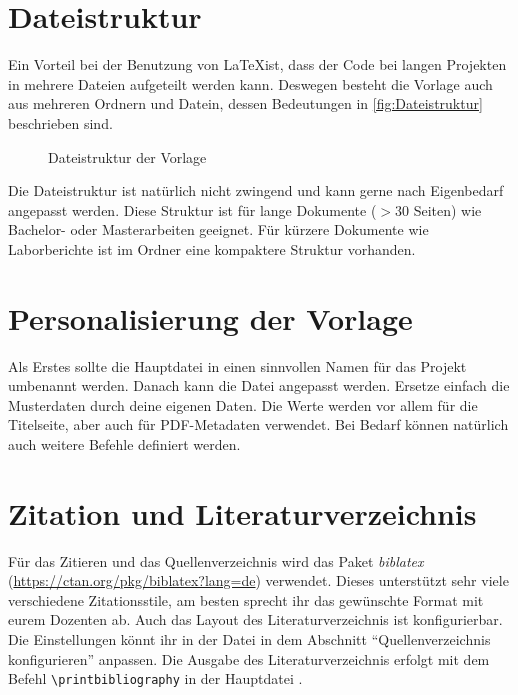 \section{Dateistruktur}
Ein Vorteil bei der Benutzung von \LaTeX ist, dass der Code bei langen Projekten in mehrere Dateien aufgeteilt werden kann. Deswegen besteht die Vorlage auch aus mehreren Ordnern und Datein, dessen Bedeutungen in \vref{fig:Dateistruktur} beschrieben sind.

\begin{figure}[h]
	\caption{Dateistruktur der Vorlage}
	\label{fig:Dateistruktur}
\end{figure}

Die Dateistruktur ist natürlich nicht zwingend und kann gerne nach Eigenbedarf angepasst werden. Diese Struktur ist für lange Dokumente ($>30$ Seiten) wie Bachelor- oder Masterarbeiten geeignet. Für kürzere Dokumente wie Laborberichte ist im Ordner  eine kompaktere Struktur vorhanden.

\section{Personalisierung der Vorlage}
Als Erstes sollte die Hauptdatei  in einen sinnvollen Namen für das Projekt umbenannt werden. Danach kann die Datei  angepasst werden. Ersetze einfach die Musterdaten durch deine eigenen Daten. Die Werte werden vor allem für die Titelseite, aber auch für PDF-Metadaten verwendet. Bei Bedarf können natürlich auch weitere Befehle definiert werden.

\section{Zitation und Literaturverzeichnis}
Für das Zitieren und das Quellenverzeichnis wird das Paket \textit{biblatex} (\url{https://ctan.org/pkg/biblatex?lang=de}) verwendet. Dieses unterstützt sehr viele verschiedene Zitationsstile, am besten sprecht ihr das gewünschte Format mit eurem Dozenten ab. Auch das Layout des Literaturverzeichnis ist konfigurierbar. Die Einstellungen könnt ihr in der Datei  in dem Abschnitt \enquote{Quellenverzeichnis konfigurieren} anpassen. Die Ausgabe des Literaturverzeichnis erfolgt mit dem Befehl \verb|\printbibliography| in der Hauptdatei .

